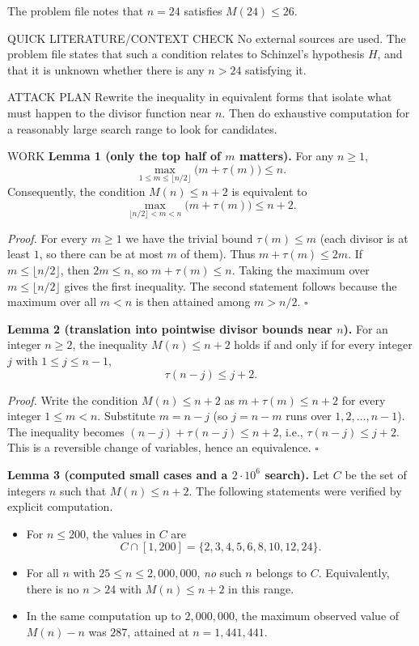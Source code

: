 The problem file notes that $n=24$ satisfies $M(24)\le 26$.

QUICK LITERATURE/CONTEXT CHECK
No external sources are used.
The problem file states that such a condition relates to Schinzel's hypothesis $H$,
and that it is unknown whether there is any $n>24$ satisfying it.

ATTACK PLAN
Rewrite the inequality in equivalent forms that isolate what must happen to the
divisor function near $n$.
Then do exhaustive computation for a reasonably large search range to look for
candidates.

WORK
\textbf{Lemma 1 (only the top half of $m$ matters).}
For any $n\ge1$,
\[
\max_{1\le m\le \lfloor n/2\rfloor}\bigl(m+\tau(m)\bigr) \le n.
\]
Consequently, the condition $M(n)\le n+2$ is equivalent to
\[
\max_{\lfloor n/2\rfloor < m < n}\bigl(m+\tau(m)\bigr) \le n+2.
\]

\emph{Proof.}
For every $m\ge1$ we have the trivial bound $\tau(m)\le m$ (each divisor is at
least $1$, so there can be at most $m$ of them).
Thus $m+\tau(m)\le 2m$.
If $m\le \lfloor n/2\rfloor$, then $2m\le n$, so $m+\tau(m)\le n$.
Taking the maximum over $m\le \lfloor n/2\rfloor$ gives the first inequality.
The second statement follows because the maximum over all $m<n$ is then attained
among $m>n/2$.
\hfill $\square$

\medskip
\textbf{Lemma 2 (translation into pointwise divisor bounds near $n$).}
For an integer $n\ge2$, the inequality $M(n)\le n+2$ holds if and only if
for every integer $j$ with $1\le j\le n-1$,
\[
\tau(n-j) \le j+2.
\]

\emph{Proof.}
Write the condition $M(n)\le n+2$ as
$m+\tau(m)\le n+2$ for every integer $1\le m<n$.
Substitute $m=n-j$ (so $j=n-m$ runs over $1,2,\dots,n-1$).
The inequality becomes
$(n-j)+\tau(n-j)\le n+2$, i.e., $\tau(n-j)\le j+2$.
This is a reversible change of variables, hence an equivalence.
\hfill $\square$

\medskip
\textbf{Lemma 3 (computed small cases and a $2\cdot 10^6$ search).}
Let $C$ be the set of integers $n$ such that $M(n)\le n+2$.
The following statements were verified by explicit computation.
\begin{itemize}
\item For $n\le 200$, the values in $C$ are
\[
C\cap[1,200]=\{2,3,4,5,6,8,10,12,24\}.
\]
\item For all $n$ with $25\le n\le 2{,}000{,}000$, \emph{no} such $n$ belongs to $C$.
Equivalently, there is no $n>24$ with $M(n)\le n+2$ in this range.
\item In the same computation up to $2{,}000{,}000$, the maximum observed value of
$M(n)-n$ was $287$, attained at $n=1{,}441{,}441$.
\end{itemize}

